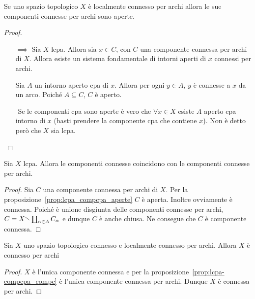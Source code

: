 \begin{proposition}\label{prop:lcpa_compcpa_aperte}
    Se uno spazio topologico \(X\) è localmente connesso per archi allora le
    sue componenti connesse per archi sono aperte.
\end{proposition}
\begin{proof}\( \)
\begin{itemize}
    \item[\(\implies \)] Sia \(X\) lcpa. Allora sia \(x \in C\), con \(C\) una
        componente connessa per archi di \(X\). Allora esiste un sistema
        fondamentale di intorni aperti di \(x\) connessi per archi.

        Sia \(A\) un intorno aperto cpa di \(x\). Allora per ogni \(y \in A\),
        \(y\) è connesse a \(x\) da un arco. Poiché \(A \subseteq C\), \(C\) è
        aperto.
    \item[\( \)] Se le componenti cpa sono aperte è vero che \(\forall
        x \in X\) esiste \(A\) aperto cpa intorno di \(x\) (basti prendere la
        componente cpa che contiene \(x\)). Non è detto però che \(X\) sia lcpa.
\end{itemize}
\end{proof}
\begin{proposition}\label{prop:lcpa-compcpa_compc}
    Sia \(X\) lcpa. Allora le componenti connesse coincidono con le componenti
    connesse per archi.
\end{proposition}
\begin{proof}
    Sia \(C\) una componente connessa per archi di \(X\). Per la
    proposizione~\ref{prop:lcpa_compcpa_aperte} \(C\) è aperta. Inoltre
    ovviamente è connessa. Poiché è unione disgiunta delle componenti connesse
    per archi, \(C = X \sminus \coprod_{\alpha \in A} C_{\alpha} \) e dunque
    \(C\) è anche chiusa. Ne consegue che \(C\) è componente connessa.
\end{proof}

\begin{theorem}\label{thm:conn-lcpa_cpa}
    Sia \(X\) uno spazio topologico connesso e localmente connesso per archi.
    Allora \(X\) è connesso per archi
\end{theorem}
\begin{proof}
    \(X\) è l'unica componente connessa e per la
    proposizione~\ref{prop:lcpa-compcpa_compc} è l'unica componente connessa per
    archi. Dunque \(X\) è connessa per archi.
\end{proof}

